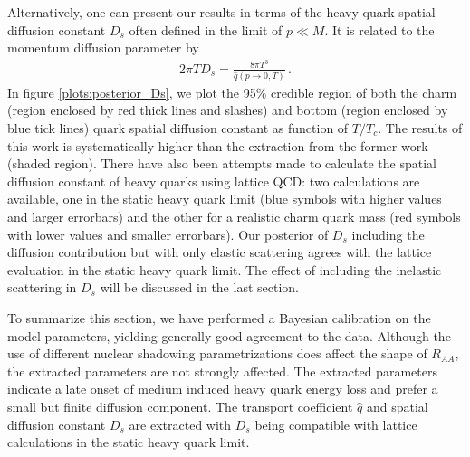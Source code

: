 \documentclass[aps, prc, reprint, amsmath, groupedaddress, nofootinbib]{revtex4-1}
\begin{document}
Alternatively, one can present our results in terms of the heavy quark spatial diffusion constant $D_s$ often defined in the limit of $p\ll M$.
It is related to the momentum diffusion parameter by
\begin{eqnarray}
2\pi T D_s = \frac{8\pi T^3}{\hat{q}(p\rightarrow 0, T)} \, .
\end{eqnarray}
In figure \ref{plots:posterior_Ds}, we plot the 95\% credible region of both the charm (region enclosed by red thick lines and slashes) and bottom (region enclosed by blue tick lines) quark spatial diffusion constant as function of $T/T_c$.
The results of this work is systematically higher than the extraction from the former work (shaded region).
There have also been attempts made to calculate the spatial diffusion constant of heavy quarks using lattice QCD: two calculations are available, one in the static heavy quark limit (blue symbols with higher values and larger errorbars) and the other for a realistic charm quark  mass (red symbols with lower values and smaller errorbars).
Our posterior of $D_s$ including the diffusion contribution but with only elastic scattering agrees with the  lattice evaluation in the static heavy quark limit.
The effect of including the inelastic scattering in $D_s$ will be discussed in the last section.

To summarize this section, we have performed a Bayesian calibration on the model parameters, yielding
generally good agreement to the data.
Although the use of different nuclear shadowing parametrizations does affect the shape of $R_{AA}$, the extracted parameters are not strongly affected.
The extracted parameters indicate a late onset of medium induced heavy quark energy loss and prefer a small but finite diffusion component.
The transport coefficient $\hat{q}$ and spatial diffusion constant $D_s$ are extracted with $D_s$ being compatible with lattice calculations in the static heavy quark limit. 
\end{document}
